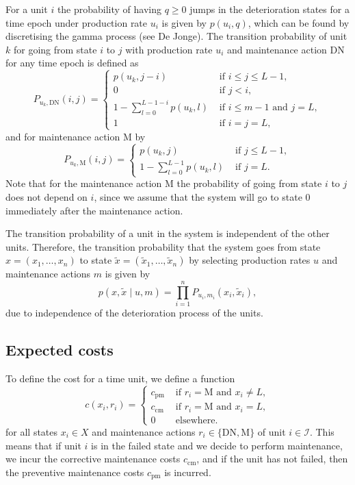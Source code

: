 \documentclass[a4paper,12pt]{article}
\begin{document}
For a unit $i$ the probability of having $q \geq 0$ jumps in the deterioration states for a time epoch under production rate $u_i$ is given by $p(u_i,q)$, which can be found by discretising the gamma process (see De Jonge). The transition probability of unit $k$ for going from state $i$ to $j$ with production rate $u_i$ and maintenance action DN for any time epoch is defined as
$$
P_{u_k,\text{DN}}(i,j) = \begin{cases}
p(u_k, j-i) &\text{ if } i \leq j \leq L-1, \\
0 &\text{ if } j < i, \\
1 - \sum_{l=0}^{L-1-i}p(u_k,l) & \text{ if } i \leq m-1  \text{ and } j = L, \\
1 & \text{ if } i = j = L,
\end{cases}
$$
and for maintenance action M by
$$
P_{u_k,\text{M}}(i,j) = \begin{cases}
p(u_k, j) &\text{ if } j \leq  L-1, \\
1 - \sum_{l=0}^{L-1}p(u_k,l) & \text{ if } j = L.
\end{cases}
$$
Note that for the maintenance action M the probability of going from state $i$ to $j$ does not depend on $i$, since we assume that the system will go to state 0 immediately after the maintenance action.

The transition probability of a unit in the system is independent of the other units. Therefore, the transition probability that the system goes from state $x = (x_1, \dots, x_n)$ to state $\tilde{x} = (\tilde{x}_1, \dots, \tilde{x}_n)$ by selecting production rates $u$ and maintenance actions $m$ is given by
$$
p(x, \tilde{x} \mid u, m) = \prod_{i = 1}^nP_{u_i,m_i}(x_i, \tilde{x}_i),
$$
due to independence of the deterioration process of the units.


\subsection{Expected costs}
To define the cost for a time unit, we define a function
$$
c(x_i,r_i) = \begin{cases}
c_{\text{pm}} & \text{ if } r_i = \text{M} \text{ and } x_i \neq L, \\
c_{\text{cm}} & \text{ if } r_i = \text{M} \text{ and } x_i = L, \\
0 & \text{ elsewhere}.
\end{cases}
$$
for all states $x_i \in X$ and maintenance actions $r_i \in \{\text{DN}, \text{M}\}$ of unit $i \in \mathcal{I}$. This means that if unit $i$ is in the failed state and we decide to perform maintenance, we incur the corrective maintenance costs $c_{\text{cm}}$, and if the unit has not failed, then the preventive maintenance costs $c_{\text{pm}}$ is incurred. 
\end{document}
